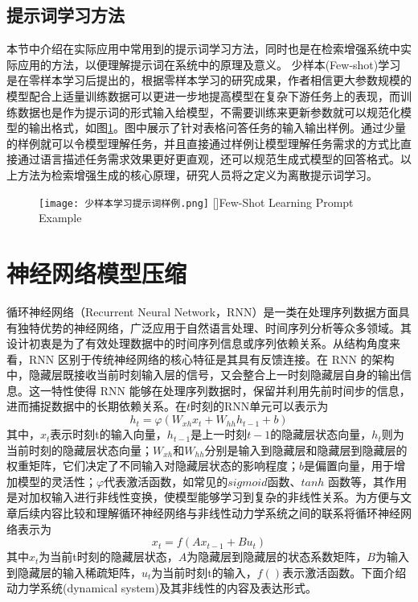 \subsection{提示词学习方法}

本节中介绍在实际应用中常用到的提示词学习方法，同时也是在检索增强系统中实际应用的方法，以便理解提示词在系统中的原理及意义。
少样本(Few-shot)学习是在零样本学习后提出的，根据零样本学习的研究成果，作者相信更大参数规模的模型配合上适量训练数据可以更进一步地提高模型在复杂下游任务上的表现，而训练数据也是作为提示词的形式输入给模型，不需要训练来更新参数就可以规范化模型的输出格式，如图\ref{fig: 少样本学习提示词样例}。图中展示了针对表格问答任务的输入输出样例。通过少量的样例就可以令模型理解任务，并且直接通过样例让模型理解任务需求的方式比直接通过语言描述任务需求效果更好更直观，还可以规范生成式模型的回答格式。以上方法为检索增强生成的核心原理，研究人员将之定义为离散提示词学习。
\begin{figure}[htbp]
  \centering
  \texttt{[image: 少样本学习提示词样例.png]}
  []{Few-Shot Learning Prompt Example}
  \label{fig: 少样本学习提示词样例}
\end{figure}


\section{神经网络模型压缩}
循环神经网络（Recurrent Neural Network，RNN）是一类在处理序列数据方面具有独特优势的神经网络，广泛应用于自然语言处理、时间序列分析等众多领域。其设计初衷是为了有效处理数据中的时间序列信息或序列依赖关系。从结构角度来看，RNN 区别于传统神经网络的核心特征是其具有反馈连接。在 RNN 的架构中，隐藏层既接收当前时刻输入层的信号，又会整合上一时刻隐藏层自身的输出信息。这一特性使得 RNN 能够在处理序列数据时，保留并利用先前时间步的信息，进而捕捉数据中的长期依赖关系。在$t$时刻的RNN单元可以表示为
\begin{equation}
  \label{eq:rnn}
  {h_t} = \varphi ({W_{xh}}{x_t} + {W_{hh}}{h_{t - 1}} + b)
\end{equation}
其中，$x_t$表示时刻t的输入向量，$h_{t-1}$是上一时刻$t-1$的隐藏层状态向量，$h_t$则为当前时刻的隐藏层状态向量；$W_{xh}$和$W_{hh}$分别是输入到隐藏层和隐藏层到隐藏层的权重矩阵，它们决定了不同输入对隐藏层状态的影响程度；$b$是偏置向量，用于增加模型的灵活性；$\varphi$代表激活函数，如常见的$sigmoid$函数、$tanh$ 函数等，其作用是对加权输入进行非线性变换，使模型能够学习到复杂的非线性关系。为方便与文章后续内容比较和理解循环神经网络与非线性动力学系统之间的联系将循环神经网络表示为
\begin{equation}
  \label{eq:rnn2}
  {x_t} = f(A{x_{t - 1}} + B{u_t})
\end{equation}
其中$x_t$为当前t时刻的隐藏层状态，$A$为隐藏层到隐藏层的状态系数矩阵，$B$为输入到隐藏层的输入稀疏矩阵，$u_t$为当前时刻t的输入，$f()$表示激活函数。下面介绍动力学系统(dynamical system)及其非线性的内容及表达形式。

